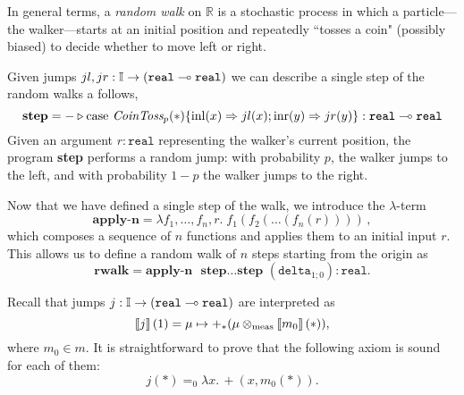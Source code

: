 \begin{example} 

In general terms, a \emph{random walk} on $\mathbb{R}$ is a stochastic process in which a particle---the walker---starts at an initial position and repeatedly ``tosses a coin" (possibly biased) to decide whether to move left or right.

Given jumps $jl,jr:\mathbb{I} \to (\mathtt{real} \multimap \mathtt{real})$ we can describe a single step of the random walks a follows,
\[
        \textbf{step} =  - \triangleright \text{case } \emph{CoinToss}_p (*) \{ \mathrm{inl}(x) \Rightarrow jl(x) ; 
        \mathrm{inr}(y) \Rightarrow jr(y) \} : \mathtt{real} \multimap \mathtt{real}
\]
Given an argument $ r:\mathtt{real}$ representing the walker's current position, the program \textbf{step} performs a random jump: with probability $p$, the walker jumps to the left, and with probability $1 - p$ the walker jumps to the right.




Now that we have defined a single step of the walk, we introduce the $\lambda$-term 
\[
\textbf{apply-n} = \lambda f_1, \dots, f_n, r.\; f_1(f_2(\dots(f_n(r))))\,,
\]
which composes a sequence of \( n \) functions and applies them to an initial input \( r \). This allows us to define a random walk of \( n \) steps starting from the origin as
\[
\textbf{rwalk} = \textbf{apply-n } \textbf{ step} \ldots \textbf{step } (\mathtt{delta}_{1;0}) :  \mathtt{real}.
\]





Recall that jumps $j: \mathbb{I} \to (\mathtt{real} \multimap \mathtt{real}) $ are interpreted as 
\[ 
\left \llbracket j \right \rrbracket(1)= \mu \mapsto +_\ast(\mu \otimes_{\text{meas}} \left \llbracket m_0 \right \rrbracket(*)),
\]
where $m_0 \in m$.
It is straightforward to prove that the following axiom is sound for each of them:
        \begin{equation} \label{eq:ax_jump}
                j(\ast) =_0 \lambda x. \, +(x, m_0 (\ast)).
         \end{equation}


\end{example}
